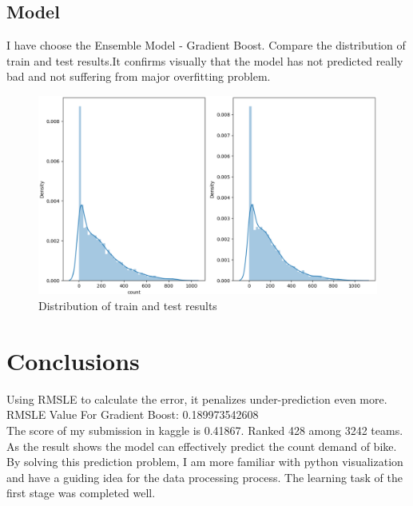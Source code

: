 \documentclass{amsart}
\begin{document}
\subsection{Model}
I have choose the Ensemble Model - Gradient Boost. Compare the distribution of train and test results.It confirms visually that the model has not predicted really bad and not suffering from major overfitting problem.
\begin{figure}[htbp]
	\includegraphics[scale=0.4]{./figure/models_Figure_1.eps}
	\caption{Distribution of train and test results}
\end{figure}

\section{Conclusions} \label{sec-conclusions}
Using RMSLE to calculate the error, it penalizes under-prediction even more.\\
RMSLE Value For Gradient Boost:  0.189973542608\\
The score of my submission in kaggle is 0.41867. Ranked 428 among 3242 teams.\\

As the result shows the model can effectively predict the count demand of bike. By solving this prediction problem, I am more familiar with python visualization and have a guiding idea for the data processing process. The learning task of the first stage was completed well.







\newpage



\end{document}
